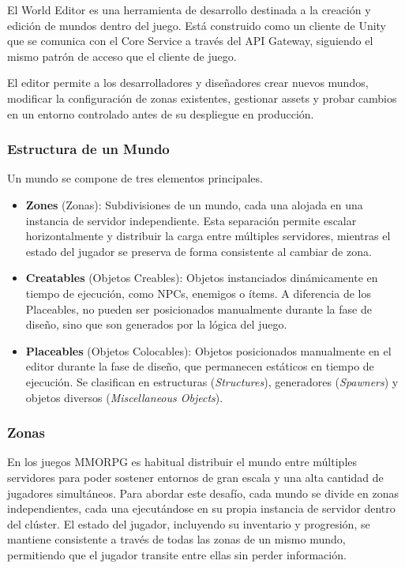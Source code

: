 El World Editor es una herramienta de desarrollo destinada a la creación y edición de mundos dentro del juego. 
Está construido como un cliente de Unity que se comunica con el Core Service a través del API Gateway, siguiendo el mismo 
patrón de acceso que el cliente de juego.

El editor permite a los desarrolladores y diseñadores crear nuevos mundos,
modificar la configuración de zonas existentes, gestionar assets y probar cambios en un entorno controlado antes de su despliegue en producción.


\subsubsection{Estructura de un Mundo}

Un mundo se compone de tres elementos principales.
\begin{itemize}
  \item \textbf{Zones} (Zonas): Subdivisiones de un mundo, cada una alojada en una instancia de servidor independiente. 
  Esta separación permite escalar horizontalmente y distribuir la carga entre múltiples servidores, mientras el estado 
  del jugador se preserva de forma consistente al cambiar de zona.
\item \textbf{Creatables} (Objetos Creables): Objetos instanciados dinámicamente en tiempo de ejecución, como NPCs, 
enemigos o ítems. A diferencia de los Placeables, no pueden ser posicionados manualmente durante la fase de diseño, 
sino que son generados por la lógica del juego.
\item \textbf{Placeables} (Objetos Colocables): Objetos posicionados manualmente en el editor durante la fase de diseño, 
que permanecen estáticos en tiempo de ejecución. Se clasifican en estructuras (\textit{Structures}), generadores 
(\textit{Spawners}) y objetos diversos (\textit{Miscellaneous Objects}).
\end{itemize}

\subsubsection{Zonas}

En los juegos MMORPG es habitual distribuir el mundo entre múltiples 
servidores para poder sostener entornos de gran escala y una alta cantidad de jugadores simultáneos. Para abordar este 
desafío, cada mundo se divide en zonas independientes, cada una ejecutándose en su propia instancia de servidor dentro 
del clúster. El estado del jugador, incluyendo su inventario y progresión, se mantiene consistente a través de todas 
las zonas de un mismo mundo, permitiendo que el jugador transite entre ellas sin perder información.

